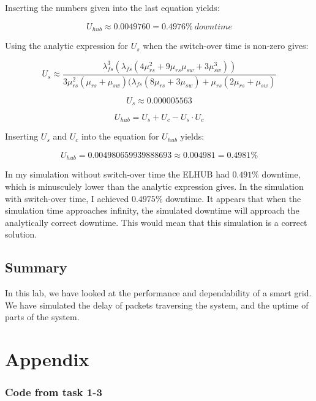 \documentclass[11pt]{article}
\begin{document}
Inserting the numbers given into the last equation yields:

$$U_{hub} \approx 0.0049760 = 0.4976\%\ downtime$$

Using the analytic expression for $U_s$ when the switch-over time is non-zero gives:

$$U_s \approx \frac{\lambda_{fs}^3(\lambda_{fs}(4\mu_{rs}^2 + 9\mu_{rs}\mu_{sw} + 3\mu_{sw}^3))}{3\mu_{rs}^2(\mu_{rs}+\mu_{sw})(\lambda_{fs}(8\mu_{rs} + 3\mu_{sw}) + \mu_{rs}(2\mu_{rs}+\mu_{sw})} $$

$$U_s \approx 0.000005563$$

$$U_{hub} = U_s + U_c - U_s \cdot U_c$$

Inserting $U_s$ and $U_c$ into the equation for $U_{hub}$ yields:

$$U_{hub} = 0.004980659939888693 \approx 0.004981 = 0.4981\%$$
 
In my simulation without switch-over time the ELHUB had $0.491\%$ downtime, which is minusculely lower than the analytic expression gives. In the simulation with switch-over time, I achieved $0.4975\%$ downtime. It appears that when the simulation time approaches infinity, the simulated downtime will approach the analytically correct downtime. This would mean that this simulation is a correct solution.

\subsection{Summary}

In this lab, we have looked at the performance and dependability of a smart grid. We have simulated the delay of packets traversing the system, and the uptime of parts of the system.


\section*{Appendix}

\subsubsection{Code from task 1-3}
\end{document}
